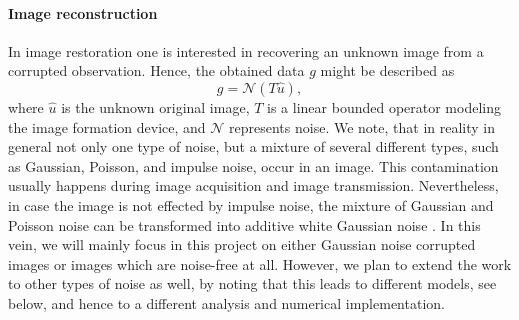 \documentclass[enabledeprecatedfontcommands,cleardoublepage=empty,headsepline,twoside,11pt,DIV=15,BCOR=12mm,final]{scrartcl}
\begin{document}
\paragraph{Image reconstruction}

In image restoration one is interested in recovering an unknown image from a corrupted observation. Hence, the obtained data $g$ might be described as
$$
g=\mathcal{N}(T\hat{u}),
$$
where $\hat{u}$ is the unknown original image, $T$ is a linear bounded operator modeling the image formation device, and $\mathcal{N}$ represents noise. %
We note, that in reality in general not only one type of noise, but a mixture of several different types, such as Gaussian, Poisson, and impulse noise, occur in an image. This contamination usually happens during image acquisition and image transmission. Nevertheless, in case the image is not effected by impulse noise, the mixture of Gaussian and Poisson noise can be transformed into additive white Gaussian noise \cite{}. In this vein, we will mainly focus in this project on either  Gaussian noise corrupted images or images which are noise-free at all. However, we plan to extend the work to other types of noise as well, by noting that this leads to different models, see below, and hence to a different analysis and numerical implementation. 
\end{document}

